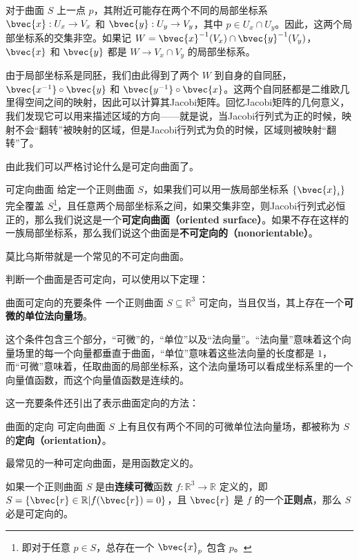 

对于曲面 $S$ 上一点 $p$，其附近可能存在两个不同的局部坐标系 $\bvec{x}:U_x\to V_x$ 和 $\bvec{y}:U_y\to V_y$，其中 $p\in U_x\cap U_y$。因此，这两个局部坐标系的交集非空。如果记 $W=\bvec{x}^{-1}(V_x)\cap\bvec{y}^{-1}(V_y)$，$\bvec{x}$ 和 $\bvec{y}$ 都是 $W\to V_x\cap V_y$ 的局部坐标系。

由于局部坐标系是同胚，我们由此得到了两个 $W$ 到自身的自同胚，$\bvec{x^{-1}}\circ\bvec{y}$ 和 $\bvec{y^{-1}}\circ\bvec{x}$。这两个自同胚都是二维欧几里得空间之间的映射，因此可以计算其Jacobi矩阵。回忆Jacobi矩阵的几何意义，我们发现它可以用来描述区域的方向——就是说，当Jacobi行列式为正的时候，映射不会“翻转”被映射的区域，但是Jacobi行列式为负的时候，区域则被映射“翻转”了。

由此我们可以严格讨论什么是可定向曲面了。

\begin{definition}{可定向曲面}
给定一个正则曲面 $S$，如果我们可以用一族局部坐标系 $\{\bvec{x}_i\}$ 完全覆盖 $S$\footnote{即对于任意 $p\in S$，总存在一个 $\bvec{x}_p$ 包含 $p$。}，且任意两个局部坐标系之间，如果交集非空，则Jacobi行列式必恒正的，那么我们说这是一个\textbf{可定向曲面（oriented surface）}。如果不存在这样的一族局部坐标系，那么我们说这个曲面是\textbf{不可定向的（nonorientable）}。
\end{definition}

莫比乌斯带就是一个常见的不可定向曲面。

判断一个曲面是否可定向，可以使用以下定理：

\begin{theorem}{曲面可定向的充要条件}
一个正则曲面 $S\subseteq \mathbb{R}^3$ 可定向，当且仅当，其上存在一个\textbf{可微的单位法向量场}。
\end{theorem}

这个条件包含三个部分，“可微”的，“单位”以及“法向量”。“法向量”意味着这个向量场里的每一个向量都垂直于曲面，“单位”意味着这些法向量的长度都是 $1$，而“可微”意味着，任取曲面的局部坐标系，这个法向量场可以看成坐标系里的一个向量值函数，而这个向量值函数是连续的。

这一充要条件还引出了表示曲面定向的方法：

\begin{definition}{曲面的定向}
可定向曲面 $S$ 上有且仅有两个不同的可微单位法向量场，都被称为 $S$ 的\textbf{定向（orientation）}。
\end{definition}

最常见的一种可定向曲面，是用函数定义的。

\begin{theorem}{}
如果一个正则曲面 $S$ 是由\textbf{连续可微}函数 $f:\mathbb{R}^3\to \mathbb{R}$ 定义的，即 $S=\{\bvec{r}\in\mathbb{R}|f(\bvec{r})=0\}$，且 $\bvec{r}$ 是 $f$ 的一个\textbf{正则点}，那么 $S$ 必是可定向的。
\end{theorem}






